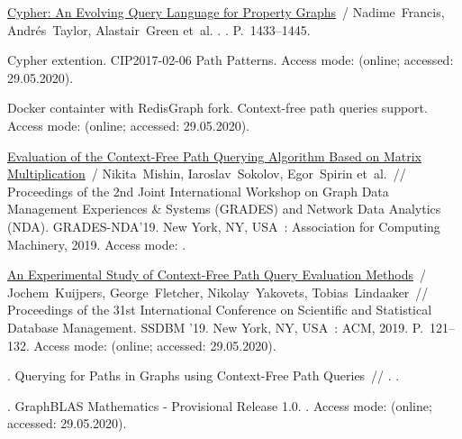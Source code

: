 \begin{thebibliography}{10}
\href{http://dx.doi.org/10.1145/3183713.3190657}{Cypher: An Evolving Query
  Language for Property Graphs}~/ Nadime~Francis, Andrés~Taylor,
  Alastair~Green et~al. \BibDash
{}. . \BibDash
\newblock P.~1433--1445.

Cypher extention. CIP2017-02-06 Path Patterns. \BibDash
\newblock Access mode:
  (online; accessed: 29.05.2020).

Docker containter with RedisGraph fork. Context-free path queries support.
  \BibDash
\newblock Access mode: 
  (online; accessed: 29.05.2020).

\href{http://dx.doi.org/10.1145/3327964.3328503}{Evaluation of the Context-Free
  Path Querying Algorithm Based on Matrix Multiplication}~/ Nikita~Mishin,
  Iaroslav~Sokolov, Egor~Spirin et~al.~// Proceedings of the 2nd Joint
  International Workshop on Graph Data Management Experiences \& Systems
  (GRADES) and Network Data Analytics (NDA). \BibDash
\newblock GRADES-NDA’19. \BibDash
\newblock New York, NY, USA~: Association for Computing Machinery, 2019.
  \BibDash
\newblock Access mode: .

\href{http://dx.doi.org/10.1145/3335783.3335791}{An Experimental Study of
  Context-Free Path Query Evaluation Methods}~/ Jochem~Kuijpers,
  George~Fletcher, Nikolay~Yakovets, Tobias~Lindaaker~// Proceedings of the
  31st International Conference on Scientific and Statistical Database
  Management. \BibDash
\newblock SSDBM '19. \BibDash
\newblock New York, NY, USA~: ACM, 2019. \BibDash
\newblock P.~121--132. \BibDash
\newblock Access mode: 
  (online; accessed: 29.05.2020).

. Querying for Paths in Graphs using Context-Free Path
  Queries~// . \BibDash
{}.

. GraphBLAS Mathematics - Provisional Release 1.0.
  \BibDash
{}. \BibDash
\newblock Access mode:
  (online; accessed: 29.05.2020).


\end{thebibliography}
